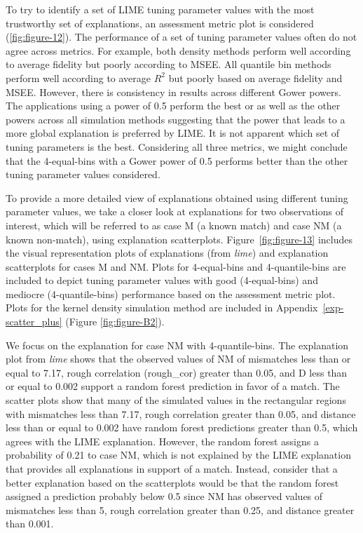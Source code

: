 \documentclass[AMS,STIX2COL]{WileyNJD-v2}\usepackage[]{graphicx}\usepackage[]{color}
\begin{document}
To try to identify a set of LIME tuning parameter values with the most trustworthy set of explanations, an assessment metric plot is considered (\autoref{fig:figure-12}). The performance of a set of tuning parameter values often do not agree across metrics. For example, both density methods perform well according to average fidelity but poorly according to MSEE. All quantile bin methods perform well according to average $R^2$ but poorly based on average fidelity and MSEE. However, there is consistency in results across different Gower powers. The applications using a power of 0.5 perform the best or as well as the other powers across all simulation methods suggesting that the power that leads to a more global explanation is preferred by LIME.  It is not apparent which set of tuning parameters is the best. Considering all three metrics, we might conclude that the 4-equal-bins with a Gower power of 0.5 performs better than the other tuning parameter values considered.

To provide a more detailed view of explanations obtained using different tuning parameter values, we take a closer look at explanations for two observations of interest, which will be referred to as case M (a known match) and case NM (a known non-match), using explanation scatterplots. Figure~\ref{fig:figure-13} includes the visual representation plots of explanations (from \emph{lime}) and explanation scatterplots for cases M and NM. Plots for 4-equal-bins and 4-quantile-bins are included to depict tuning parameter values with good (4-equal-bins) and mediocre (4-quantile-bins) performance based on the assessment metric plot. Plots for the kernel density simulation method are included in Appendix~\ref{exp-scatter_plus} (Figure \ref{fig:figure-B2}). 

We focus on the explanation for case NM with 4-quantile-bins. The explanation plot from \emph{lime} shows that the observed values of NM of mismatches less than or equal to 7.17, rough correlation (rough\_cor) greater than 0.05, and D less than or equal to 0.002 support a random forest prediction in favor of a match. The scatter plots show that many of the simulated values in the rectangular regions with mismatches less than 7.17, rough correlation greater than 0.05, and distance less than or equal to 0.002 have random forest predictions greater than 0.5, which agrees with the LIME explanation. However, the random forest assigns a probability of 0.21 to case NM, which is not explained by the LIME explanation that provides all explanations in support of a match. Instead, consider that a better explanation based on the scatterplots would be that the random forest assigned a prediction probably below 0.5 since NM has observed values of mismatches less than 5, rough correlation greater than 0.25, and distance greater than 0.001.
\end{document}
